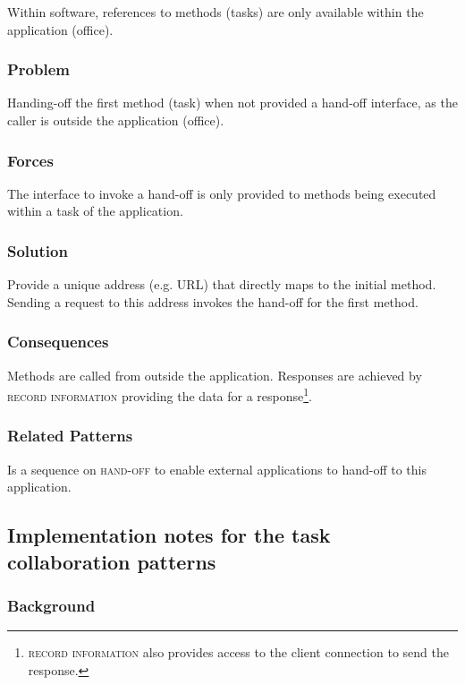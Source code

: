 \documentclass[prodmode]{style/acmlarge}
\begin{document}
Within software, references to methods (tasks) are only available within the
application (office).

\subsubsection*{\textbf{Problem}} Handing-off the first method (task) when not
provided a hand-off interface, as the caller is outside the application
(office).

\subsubsection*{Forces} The interface to invoke a hand-off is only provided to
methods being executed within a task of the application.

\subsubsection*{\textbf{Solution}} Provide a unique address (e.g. URL) that directly maps
to the initial method.  Sending a request to this address invokes the hand-off
for the first method.

\subsubsection*{Consequences} Methods are called from outside the application. 
Responses are achieved by \textsc{record information} providing the data for a
response\footnote{\textsc{record information} also provides access to the client
connection to send the response.}.

\subsubsection*{Related Patterns} Is a sequence on \textsc{hand-off} to enable
external applications to hand-off to this application.



\subsection{\textbf{Implementation notes for the task collaboration patterns}}

\subsubsection*{Background}
\end{document}
